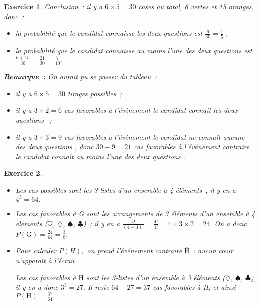 \documentclass[10pt]{article}
\newtheorem{exo}{Exercice}
\begin{document}
\begin{exo}
Conclusion~: il y a $6\times 5=30$ cases au total, 6 vertes et 15 oranges, donc~:

\begin{itemize}
\item[\textbullet] la probabilité que le candidat connaisse les deux questions est $\frac{6}{30}=\frac{1}{5}~;$
\item[\textbullet] la probabilité que le candidat connaisse au moins l'une des deux questions est $\frac{6+15}{30}=\frac{21}{30}=\frac{7}{10}.$
\end{itemize}

\medskip

\textbf{Remarque~:} On aurait pu se passer du tableau~:

\begin{itemize}
\item[\textbullet] il y a $6\times 5=30$ tirages possibles~;
\item[\textbullet] il y a $3\times 2=6$ cas favorables à l'événement \og le candidat connaît les deux questions \fg~;
\item[\textbullet] il y a $3\times 3=9$ cas favorables à l'événement \og le candidat ne connaît aucune des deux questions \fg, donc $30-9=21$ cas favorables à l'événement contraire \og le candidat connaît au moins l'une des deux questions \fg.
\end{itemize}

\end{exo}


\begin{exo}

\begin{itemize}
\item[\textbullet] Les cas possibles sont les 3-listes d'un ensemble à 4 éléments~; il y en a $4^3=64.$
\item[\textbullet] Les cas favorables à G sont les arrangements de 3 éléments d'un ensemble à 4 éléments ($\heartsuit$, $\diamondsuit$, $\spadesuit$, $\clubsuit$)~; il y en a $\frac{4!}{(4-3)!}=\frac{4!}{1!}=4\times 3\times 2=24.$ On a donc $P(\text{G})=\frac{24}{64}=\frac{3}{8}.$
\item[\textbullet] Pour calculer $P(H),$ on prend l'événement contraire $\overline{\text{H}}$~: \og aucun cœur n'apparaît à l'écran \fg.

Les cas favorables à $\overline{\text{H}}$ sont les 3-listes d'un ensemble à 3 éléments ($\diamondsuit$, $\spadesuit$, $\clubsuit$), il y en a donc $3^3=27.$ Il reste $64-27=37$ cas favorables à H, et ainsi $P(\text{H})=\frac{37}{64}.$ 
\end{itemize}
\end{exo}
\end{document}
